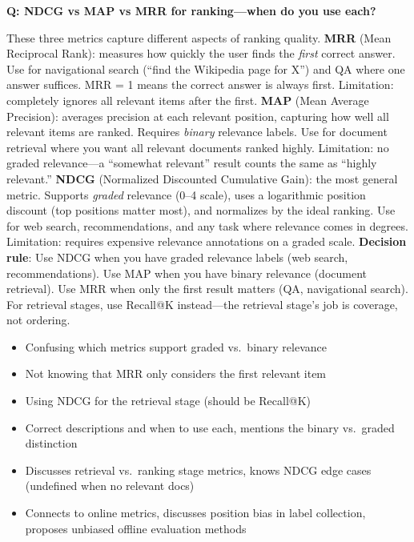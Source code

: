 \begin{interviewq}
\textbf{Q: NDCG vs MAP vs MRR for ranking---when do you use each?}

 \quad {} \quad \badgefreq{\freqhigh}

\stronganswer These three metrics capture different aspects of ranking quality. \textbf{MRR} (Mean Reciprocal Rank): measures how quickly the user finds the \textit{first} correct answer. Use for navigational search (``find the Wikipedia page for X'') and QA where one answer suffices. MRR = 1 means the correct answer is always first. Limitation: completely ignores all relevant items after the first. \textbf{MAP} (Mean Average Precision): averages precision at each relevant position, capturing how well all relevant items are ranked. Requires \textit{binary} relevance labels. Use for document retrieval where you want all relevant documents ranked highly. Limitation: no graded relevance---a ``somewhat relevant'' result counts the same as ``highly relevant.'' \textbf{NDCG} (Normalized Discounted Cumulative Gain): the most general metric. Supports \textit{graded} relevance (0--4 scale), uses a logarithmic position discount (top positions matter most), and normalizes by the ideal ranking. Use for web search, recommendations, and any task where relevance comes in degrees. Limitation: requires expensive relevance annotations on a graded scale. \textbf{Decision rule}: Use NDCG when you have graded relevance labels (web search, recommendations). Use MAP when you have binary relevance (document retrieval). Use MRR when only the first result matters (QA, navigational search). For retrieval stages, use Recall@K instead---the retrieval stage's job is coverage, not ordering.

\redflags
\begin{itemize}
    \item Confusing which metrics support graded vs.\ binary relevance
    \item Not knowing that MRR only considers the first relevant item
    \item Using NDCG for the retrieval stage (should be Recall@K)
\end{itemize}


\goodgreat
\begin{itemize}
    \item {} Correct descriptions and when to use each, mentions the binary vs.\ graded distinction
    \item {} Discusses retrieval vs.\ ranking stage metrics, knows NDCG edge cases (undefined when no relevant docs)
    \item {} Connects to online metrics, discusses position bias in label collection, proposes unbiased offline evaluation methods
\end{itemize}


\end{interviewq}
